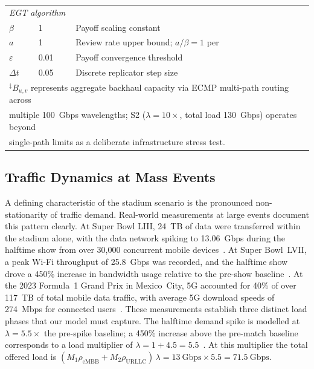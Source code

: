 \documentclass[conference]{IEEEtran}
\begin{document}
\begin{table}[ht]
\begin{tabular}{p{1.8cm}p{2.2cm}p{3.6cm}}
\midrule
\multicolumn{3}{l}{\textit{EGT algorithm~\cite{Alevizaki2021upf}}}\\
$\beta$ & 1 &
  Payoff scaling constant \\
$a$ & 1 &
  Review rate upper bound; $a/\beta=1$
  per~\cite{Alevizaki2021upf} \\
$\varepsilon$ & 0.01 &
  Payoff convergence threshold \\
$\Delta t$ & 0.05 &
  Discrete replicator step size \\
\bottomrule
\multicolumn{3}{l}{\footnotesize $^\ddagger$$B_{u,v}$ represents aggregate backhaul
  capacity via ECMP multi-path routing across}\\
\multicolumn{3}{l}{\footnotesize multiple 100~Gbps wavelengths; S2 ($\lambda=10\times$,
  total load 130~Gbps) operates beyond}\\
\multicolumn{3}{l}{\footnotesize single-path limits as a deliberate infrastructure
  stress test.}\\
\end{tabular}
\end{table}

\subsection{Traffic Dynamics at Mass Events}
\label{sec:traffic}

A defining characteristic of the stadium scenario is the
pronounced non-stationarity of traffic demand. Real-world
measurements at large events document this pattern
clearly. At Super Bowl LIII, 24~TB of data were
transferred within the stadium alone, with the data
network spiking to 13.06~Gbps during the halftime show
from over 30,000 concurrent mobile
devices~\cite{nokia_live_events}. At Super Bowl~LVII,
a peak Wi-Fi throughput of 25.8~Gbps was recorded,
and the halftime show drove a 450\% increase in
bandwidth usage relative to the pre-show
baseline~\cite{superbowl_lvii}. At the 2023 Formula~1
Grand Prix in Mexico~City, 5G accounted for 40\% of
over 117~TB of total mobile data traffic, with average
5G download speeds of 274~Mbps for connected
users~\cite{ericsson_f1_2023}. These measurements
establish three distinct load phases that our model
must capture. The halftime demand spike is modelled at
$\lambda = 5.5\times$ the pre-spike baseline; a 450\% increase
above the pre-match baseline corresponds to a load multiplier
of $\lambda = 1 + 4.5 = 5.5$~\cite{superbowl_lvii}.
At this multiplier the total offered load is
$(M_1\rho_\text{eMBB} + M_2\rho_\text{URLLC})\,\lambda
= 13~\text{Gbps} \times 5.5 = 71.5~\text{Gbps}$.
\end{document}
